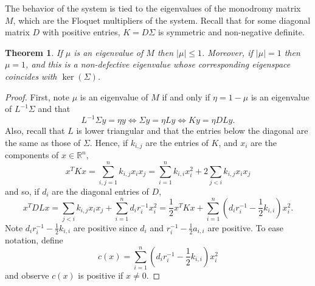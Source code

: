 \documentclass[]{interact}
\theoremstyle{plain}%
\newtheorem{theorem}{Theorem}
\theoremstyle{definition}
\theoremstyle{remark}
\newcommand{\abs}[1]{\left\vert#1\right\vert}
\def\R{\mathbb{R}}
\begin{document}
The behavior of the system is tied to the eigenvalues of the monodromy matrix $M$, which are the Floquet multipliers of the system. Recall that for some diagonal matrix $D$ with positive entries, $K=D\Sigma$ is symmetric and non-negative definite.

\begin{theorem}
If $\mu$ is an eigenvalue of $M$ then $\abs{\mu}\leq 1$. Moreover, if $\abs{\mu}=1$ then $\mu=1$, and this is a non-defective eigenvalue whose corresponding eigenspace coincides with $\ker(\Sigma)$.
\end{theorem}
\begin{proof}
First, note $\mu$ is an eigenvalue of $M$ if and only if $\eta=1-\mu$ is an eigenvalue of $L^{-1}\Sigma$ and that
\[
L^{-1}\Sigma y=\eta y \Leftrightarrow \Sigma y=\eta Ly \Leftrightarrow K y=\eta DL y.
\]
Also, recall that $L$ is lower triangular and that the entries below the diagonal are the same as those of $\Sigma$. Hence, if $k_{i,j}$ are the entries of $K$, and $x_i$ are the components of $x\in \R^n$,
\[
x^TKx=\sum_{i,j=1}^nk_{i,j}x_ix_j=\sum_{i=1}^n k_{i,i}x_i^2+2\sum_{j<i}k_{i,j}x_ix_j
\]
and so, if $d_i$ are the diagonal entries of $D$, 
\begin{equation}\label{main_id}
x^TDLx=\sum_{j<i}k_{i,j}x_ix_j+\sum_{i=1}^n d_ir_i^{-1}x_i^2=\frac{1}{2}x^TKx +\sum_{i=1}^n (d_ir_i^{-1}-\frac{1}{2}k_{i,i})x_i^2.
\end{equation}
Note $d_ir_i^{-1}-\frac{1}{2}k_{i,i}$ are positive since $d_i$ and $r_i^{-1}-\frac{1}{2}a_{i,i}$ are positive. To ease notation, define
\[
c(x)=\sum_{i=1}^n (d_ir_i^{-1}-\frac{1}{2}k_{i,i})x_i^2
\]
and observe $c(x)$ is positive if $x\neq 0$.


\end{proof}
\end{document}
